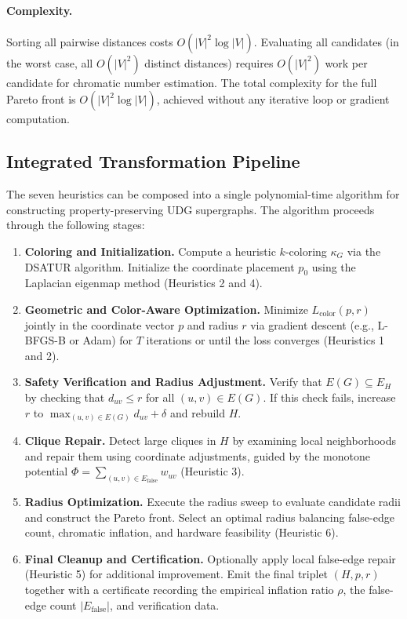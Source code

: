 \documentclass[11pt]{article}
\newcommand{\Efalse}{E_{\mathrm{false}}}
\begin{document}
\paragraph{Complexity.}
Sorting all pairwise distances costs $O(|V|^2 \log |V|)$. Evaluating all candidates (in the worst case, all $O(|V|^2)$ distinct distances) requires $O(|V|^2)$ work per candidate for chromatic number estimation. The total complexity for the full Pareto front is $O(|V|^2 \log |V|)$, achieved without any iterative loop or gradient computation.

\newpage

\subsection{Integrated Transformation Pipeline}

The seven heuristics can be composed into a single polynomial-time algorithm for constructing property-preserving UDG supergraphs. The algorithm proceeds through the following stages:

\begin{enumerate}
  \item \textbf{Coloring and Initialization.}
  Compute a heuristic $k$-coloring $\kappa_G$ via the DSATUR algorithm. Initialize the coordinate placement $p_0$ using the Laplacian eigenmap method (Heuristics 2 and 4).
  
  \item \textbf{Geometric and Color-Aware Optimization.}
  Minimize $L_{\mathrm{color}}(p,r)$ jointly in the coordinate vector $p$ and radius $r$ via gradient descent (e.g., L-BFGS-B or Adam) for $T$ iterations or until the loss converges (Heuristics 1 and 2).
  
  \item \textbf{Safety Verification and Radius Adjustment.}
  Verify that $E(G)\subseteq E_H$ by checking that $d_{uv}\le r$ for all $(u,v)\in E(G)$. If this check fails, increase $r$ to $\max_{(u,v)\in E(G)} d_{uv} + \delta$ and rebuild $H$.
  
  \item \textbf{Clique Repair.}
  Detect large cliques in $H$ by examining local neighborhoods and repair them using coordinate adjustments, guided by the monotone potential $\Phi = \sum_{(u,v)\in\Efalse} w_{uv}$ (Heuristic 3).
  
  \item \textbf{Radius Optimization.}
  Execute the radius sweep to evaluate candidate radii and construct the Pareto front. Select an optimal radius balancing false-edge count, chromatic inflation, and hardware feasibility (Heuristic 6).
  
  \item \textbf{Final Cleanup and Certification.}
  Optionally apply local false-edge repair (Heuristic 5) for additional improvement. Emit the final triplet $(H, p, r)$ together with a certificate recording the empirical inflation ratio $\rho$, the false-edge count $|\Efalse|$, and verification data.
\end{enumerate}
\end{document}
